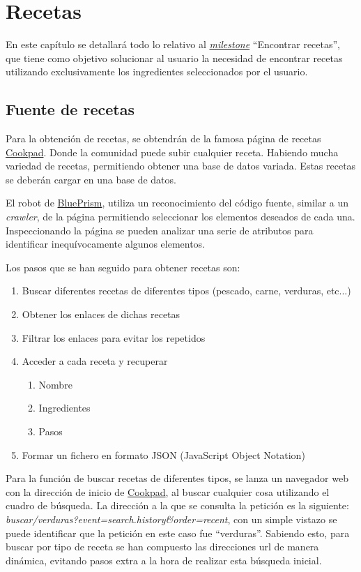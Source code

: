 \chapter{Recetas}
En este capítulo se detallará todo lo relativo al \href{https://github.com/Slowmybrosh/TFG-DietPlanner/milestone/3}{\emph{\gls{milestone}}} ``Encontrar recetas'', que tiene como objetivo solucionar al usuario la necesidad de encontrar recetas utilizando exclusivamente los ingredientes seleccionados por el usuario.

\section{Fuente de recetas}
Para la obtención de recetas, se obtendrán de la famosa página de recetas \href{https://cookpad.com/es/home}{Cookpad}. Donde la comunidad puede subir cualquier receta. Habiendo mucha variedad de recetas, permitiendo obtener una base de datos variada. Estas recetas se deberán cargar en una base de datos.

El robot de \href{https://www.blueprism.com/es/}{BluePrism}, utiliza un reconocimiento del código fuente, similar a un \emph{\gls{crawler}}, de la página permitiendo seleccionar los elementos deseados de cada una. Inspeccionando la página se pueden analizar una serie de atributos para identificar inequívocamente algunos elementos.

Los pasos que se han seguido para obtener recetas son:
\begin{enumerate}
    \item Buscar diferentes recetas de diferentes tipos (pescado, carne, verduras, etc...)
    \item Obtener los enlaces de dichas recetas
    \item Filtrar los enlaces para evitar los repetidos
    \item Acceder a cada receta y recuperar
    \begin{enumerate}
        \item Nombre
        \item Ingredientes
        \item Pasos
    \end{enumerate}
    \item Formar un fichero en formato \gls{JSON} (JavaScript Object Notation)
\end{enumerate}

Para la función de buscar recetas de diferentes tipos, se lanza un navegador web con la dirección de inicio de \href{https://cookpad.com/es/home}{Cookpad}, al buscar cualquier cosa utilizando el cuadro de búsqueda. La dirección a la que se consulta la petición es la siguiente: \emph{buscar/verduras?event=search.history&order=recent}, con un simple vistazo se puede identificar que la petición en este caso fue ``verduras''. Sabiendo esto, para buscar por tipo de receta se han compuesto las direcciones url de manera dinámica, evitando pasos extra a la hora de realizar esta búsqueda inicial. 

